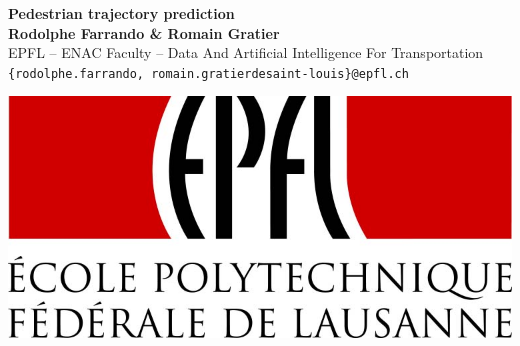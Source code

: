 \documentclass[a0,portrait]{a0poster}
\begin{document}


\begin{minipage}[b]{0.75\linewidth}
\veryHuge \color{NavyBlue} \textbf{Pedestrian trajectory prediction} \color{Black}\\ %
\huge \textbf{Rodolphe Farrando \& Romain Gratier}\\[0.5cm] %
\huge EPFL -- ENAC Faculty -- Data And Artificial Intelligence For Transportation\\[0.4cm] %
\Large \texttt{\{rodolphe.farrando, romain.gratierdesaint-louis\}@epfl.ch}\\
\end{minipage}
%
\begin{minipage}[b]{0.25\linewidth}
\includegraphics[width=20cm]{./figure/epfl_logo.jpg}\\
\end{minipage}

\vspace{1cm} %

\end{document}

